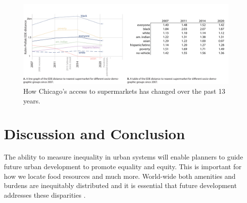 \documentclass[final,3p,times,onecolumn,sort&compress]{elsarticle}
\begin{document}
\begin{figure}
    \includegraphics[width=\linewidth]{report/fig/fig5b.pdf}
    \caption{
    How Chicago's access to supermarkets has changed over the past 13 years. 
    }
    \label{fig:chicago}
\end{figure}

\section{Discussion and Conclusion}
\label{sec:discussion}
The ability to measure inequality in urban systems will enable planners to guide future urban development to promote equality and equity.
This is important for how we locate food resources and much more.
World-wide both amenities and burdens are inequitably distributed \citep{Fussel2010-te, Bulkeley2014-so} and it is essential that future development addresses these disparities \citep{Gusdorf2008-bm, Calvin2017-ja}.
\end{document}
